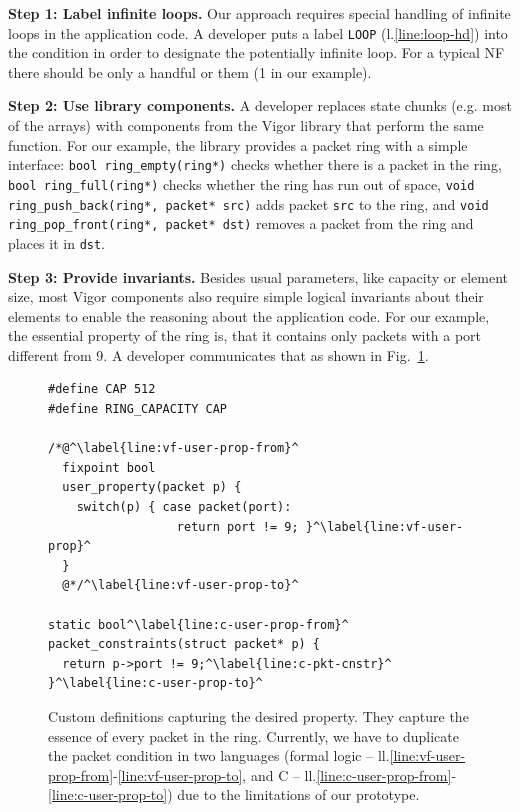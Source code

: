 \documentclass[letterpaper,twocolumn,10pt]{article}
\newcommand{\code}[1]{\lstinline{#1}}
\begin{document}
{\bf Step 1: Label infinite loops.} Our approach requires special handling of
infinite loops in the application code. A developer puts a label \code{LOOP}
(l.\ref{line:loop-hd}) into the condition in order to designate the
potentially infinite loop. For a typical NF there should be only a handful or
them (1 in our example).

{\bf Step 2: Use library components. } A developer replaces state chunks (e.g.
most of the arrays) with components from the Vigor library that perform the
same function. For our example, the library provides a packet ring with a simple
interface: \code{bool ring_empty(ring*)} checks whether there is a packet in the
ring, \code{bool ring_full(ring*)} checks whether the ring has run out of space,
\code{void ring_push_back(ring*, packet* src)} adds packet \code{src} to the
ring, and \code{void ring_pop_front(ring*, packet* dst)} removes a packet from
the ring and places it in \code{dst}.


{\bf Step 3: Provide invariants.} Besides usual parameters, like capacity or
element size, most Vigor components also require simple logical invariants about
their elements to enable the reasoning about the application code. For our
example, the essential property of the ring is, that it contains only packets
with a port different from 9. A developer communicates that as shown in
Fig.~\ref{lst:customizations}.

\begin{figure}
\begin{lstlisting}
#define CAP 512
#define RING_CAPACITY CAP

/*@^\label{line:vf-user-prop-from}^
  fixpoint bool
  user_property(packet p) {
    switch(p) { case packet(port):
                  return port != 9; }^\label{line:vf-user-prop}^
  }
  @*/^\label{line:vf-user-prop-to}^

static bool^\label{line:c-user-prop-from}^
packet_constraints(struct packet* p) {
  return p->port != 9;^\label{line:c-pkt-cnstr}^
}^\label{line:c-user-prop-to}^
\end{lstlisting}
  \caption{Custom definitions capturing the desired property. They capture the
    essence of every packet in the ring. Currently, we have to duplicate the
    packet condition in two languages (formal logic --
    ll.\ref{line:vf-user-prop-from}-\ref{line:vf-user-prop-to}, and C --
    ll.\ref{line:c-user-prop-from}-\ref{line:c-user-prop-to}) due to the
    limitations of our prototype.}
  \label{lst:customizations}
\end{figure}
\end{document}
